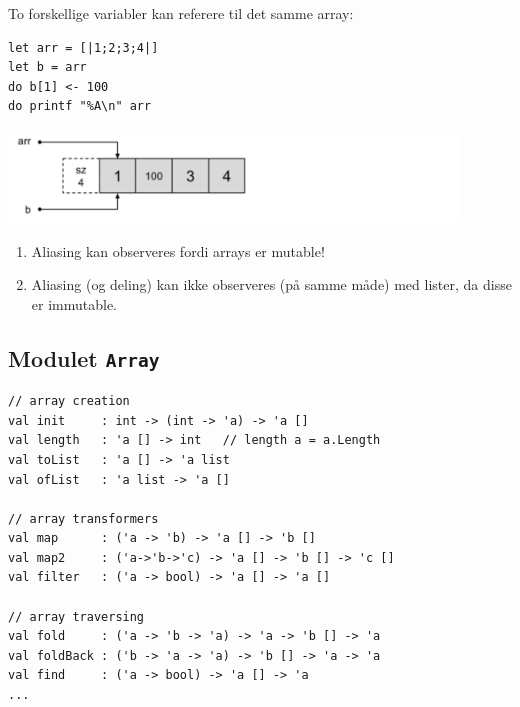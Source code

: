 \documentclass[rgb]{beamer}
\begin{document}
\begin{frame}[fragile]
\begin{footnotesize}

\vspace{1ex}

To forskellige variabler kan referere til det samme array:
\begin{lstlisting}[numbers=none,frame=none,mathescape]
let arr = [|1;2;3;4|]
let b = arr
do b[1] <- 100
do printf "%A\n" arr
\end{lstlisting}

\vspace{1ex}
\vspace{1ex}

\includegraphics[width=0.9\textwidth]{arr_b_1234.png}

\vspace{1ex}
\begin{enumerate}
\item Aliasing kan observeres fordi arrays er mutable!
\item Aliasing (og deling) kan ikke observeres (på samme måde) med lister, da disse er immutable.
\end{enumerate}

\end{footnotesize}
\end{frame}

\subsection{Modulet \lstinline{Array}}

\begin{frame}[fragile]
\begin{footnotesize}
\vspace{1ex}
\begin{lstlisting}[numbers=none,frame=none]
// array creation
val init     : int -> (int -> 'a) -> 'a []
val length   : 'a [] -> int   // length a = a.Length
val toList   : 'a [] -> 'a list
val ofList   : 'a list -> 'a []

// array transformers
val map      : ('a -> 'b) -> 'a [] -> 'b []
val map2     : ('a->'b->'c) -> 'a [] -> 'b [] -> 'c []
val filter   : ('a -> bool) -> 'a [] -> 'a []

// array traversing
val fold     : ('a -> 'b -> 'a) -> 'a -> 'b [] -> 'a
val foldBack : ('b -> 'a -> 'a) -> 'b [] -> 'a -> 'a
val find     : ('a -> bool) -> 'a [] -> 'a
...
\end{lstlisting}

\end{footnotesize}
\end{frame}
\end{document}
